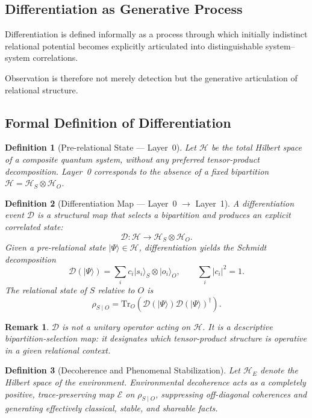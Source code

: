 \documentclass{article}
\newtheorem{definition}{Definition}
\newtheorem{remark}{Remark}
\begin{document}
\subsection{Differentiation as Generative Process}
Differentiation is defined informally as a process through which initially indistinct relational potential becomes explicitly articulated into distinguishable system--system correlations.

Observation is therefore not merely detection but the generative articulation of relational structure.

\subsection{Formal Definition of Differentiation}
\begin{definition}[Pre-relational State --- Layer~0]
Let $\mathcal{H}$ be the total Hilbert space of a composite quantum system, without any preferred tensor-product decomposition. Layer~0 corresponds to the absence of a fixed bipartition $\mathcal{H} = \mathcal{H}_S \otimes \mathcal{H}_O$.
\end{definition}

\begin{definition}[Differentiation Map --- Layer~0 $\to$ Layer~1]
A differentiation event $\mathcal{D}$ is a structural map that selects a bipartition and produces an explicit correlated state:
\[
  \mathcal{D}\colon \mathcal{H} \longrightarrow \mathcal{H}_S \otimes \mathcal{H}_O.
\]
Given a pre-relational state $\lvert\Psi\rangle \in \mathcal{H}$, differentiation yields the Schmidt decomposition
\[
  \mathcal{D}(\lvert\Psi\rangle)=\sum_i c_i\lvert s_i\rangle_S\otimes\lvert o_i\rangle_O,
  \qquad \sum_i\lvert c_i\rvert^2=1.
\]
The relational state of $S$ relative to $O$ is
\[
  \rho_{S\mid O}=\mathrm{Tr}_O\!\left(\mathcal{D}(\lvert\Psi\rangle)\mathcal{D}(\lvert\Psi\rangle)^\dagger\right).
\]
\end{definition}

\begin{remark}
$\mathcal{D}$ is not a unitary operator acting on $\mathcal{H}$. It is a descriptive bipartition-selection map: it designates which tensor-product structure is operative in a given relational context.
\end{remark}

\begin{definition}[Decoherence and Phenomenal Stabilization]
Let $\mathcal{H}_E$ denote the Hilbert space of the environment. Environmental decoherence acts as a completely positive, trace-preserving map $\mathcal{E}$ on $\rho_{S\mid O}$, suppressing off-diagonal coherences and generating effectively classical, stable, and shareable facts.
\end{definition}
\end{document}
